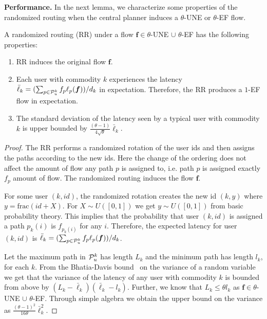 \textbf{Performance.} In the next lemma, we characterize some properties of the randomized routing when the central planner induces a  $\theta$-UNE or $\theta$-EF flow.
\begin{theorem}
A randomized routing (RR) under a flow $\bm{f}\in \theta$-UNE  $\cup$  $\theta$-EF has the following properties:
\begin{enumerate}
\item RR induces the original flow $\bm{f}$.
\item Each user with commodity $k$ experiences the latency $\bar{\ell}_k = (\sum_{p\in \mathcal{P}_{u}^k} f_p \ell_p(\bm{f}))/d_k$ in expectation. Therefore, the RR produces a $1$-EF flow in expectation. 
\item The standard deviation of the latency seen by a typical user with commodity $k$ is upper bounded by $\frac{(\theta-1)}{4\sqrt{\theta}}\bar{\ell}_k $.
\end{enumerate}
\label{thm:RR}
\end{theorem}
\begin{proof}
The RR performs a randomized rotation of the user ids and then assigns the paths according to the new ids. Here the change of the ordering does not affect the amount of flow any path $p$ is assigned to, i.e. path $p$ is assigned exactly $f_p$ amount of flow. The randomized routing induces the flow $\bm{f}$. 

For some user $(k,id)$, the randomized rotation creates the new id $(k,y)$ where $y = \text{frac}(id+X)$. For $X\sim U([0,1])$ we get $y\sim U([0,1])$ from basic probability theory. This implies that the probability that user $(k,id)$ is assigned a path $p_k(i)$ is $f_{p_k(i)}$ for any $i$. Therefore, the expected latency for user $(k,id)$ is $\bar{\ell}_k = (\sum_{p\in \mathcal{P}_{u}^k} f_p \ell_p(\bm{f}))/d_k$.

Let the maximum path in $\mathcal{P}_u^k$ has length $L_k$ and the minimum path has length $l_k$, for each $k$. From the Bhatia-Davis bound~\cite{bhatia2000better} on the variance of a random variable we get that the variance of the latency of any user with commodity $k$ is bounded from above by $(L_k - \bar{\ell}_k)(\bar{\ell}_k - l_k)$. Further, we know that $L_k \leq \theta l_k$ as $\bm{f}\in \theta$-UNE  $\cup$  $\theta$-EF. Through simple algebra we obtain the upper bound on the variance as $\frac{(\theta-1)^2}{16\theta}{\bar{\ell}}_k^2$.  
\end{proof}
  
